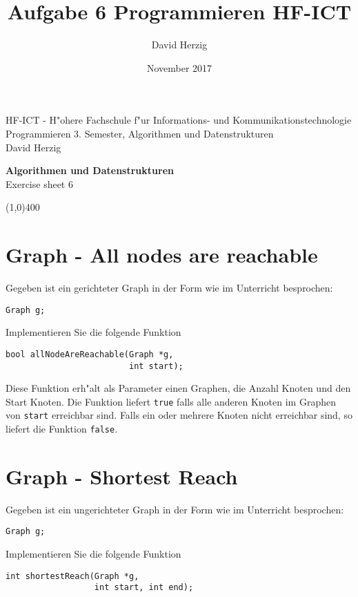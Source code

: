 \documentclass[a4paper,10pt]{article}
\title{Aufgabe 6 Programmieren HF-ICT}
\author{David Herzig}
\date{November 2017}
\begin{document}
HF-ICT - H"ohere Fachschule f"ur Informations- und Kommunikationstechnologie\\
Programmieren 3. Semester, Algorithmen und Datenstrukturen\\
David Herzig

\vspace{2mm}

\begin{center}
{\Large \bf Algorithmen und Datenstrukturen}\\
Exercise sheet 6
\end{center}

\vspace{2mm}

\line(1,0){400}

\vspace{5mm}

\section{Graph - All nodes are reachable}
Gegeben ist ein gerichteter Graph in der Form wie im Unterricht besprochen:

\begin{lstlisting}
Graph g;
\end{lstlisting}

Implementieren Sie die folgende Funktion

\begin{lstlisting}
bool allNodeAreReachable(Graph *g,
                         int start);
\end{lstlisting}

Diese Funktion erh"alt als Parameter einen Graphen, die Anzahl Knoten und den
Start Knoten. Die Funktion liefert \verb|true| falls alle anderen Knoten im Graphen
von \verb|start| erreichbar sind. Falls ein oder mehrere Knoten nicht erreichbar sind,
so liefert die Funktion \verb|false|.

\section{Graph - Shortest Reach}
Gegeben ist ein ungerichteter Graph in der Form wie im Unterricht besprochen:

\begin{lstlisting}
Graph g;
\end{lstlisting}

Implementieren Sie die folgende Funktion

\begin{lstlisting}
int shortestReach(Graph *g,
                  int start, int end);
\end{lstlisting}
\end{document}

